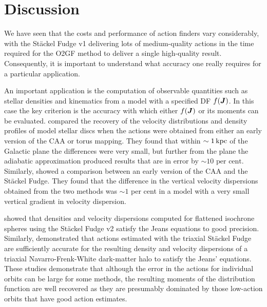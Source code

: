 \documentclass[useAMS,usenatbib,fleqn,a4paper]{mn2e}
\def\kpc{\,{\rm kpc}}
\def\percent{\text{ per cent}}
\newcommand{\bs}[1]{\bmath{#1}}
\def\percent{\text{ per cent}}
\newcommand{\vJ}{\bs{J}}\newcommand{\vx}{\bs{x}}
\begin{document}
\section{Discussion}\label{Sect::Discuss}

We have seen that the costs and performance of action finders vary
considerably, with the St\"ackel Fudge v1 delivering lots of medium-quality
actions in the time required for the O2GF method to deliver a single
high-quality result. Consequently, it is important to understand what
accuracy one really requires for a particular application.

An important application is the computation of observable quantities such as
stellar densities and kinematics from a model with a specified DF $f(\vJ)$.
In this case the key criterion is the accuracy with which either $f(\vJ)$ or
its moments can be evaluated.  \cite{BinneyMcMillan2011} compared the
recovery of the velocity distributions and density profiles of model stellar
discs when the actions were obtained from either an early version of the CAA
or torus mapping. They found that within $\sim1\kpc$ of the Galactic plane
the differences were very small, but further from the plane the adiabatic
approximation produced results that are in error by $\sim10\percent$.
Similarly, \cite{BovyRix2013} showed a comparison between an early version of
the CAA and the St\"ackel Fudge. They found that the difference in the
vertical velocity dispersions obtained from the two methods was $\sim1$ per
cent in a model with a very small vertical gradient in velocity dispersion.

\cite{Binney2014_ISO} showed that densities and velocity dispersions computed for
flattened isochrone spheres using the St\"ackel Fudge v2 satisfy the Jeans
equations to good precision. Similarly, 
\cite{SandersBinney2014} demonstrated that actions estimated with the
triaxial St\"ackel Fudge are sufficiently accurate for the resulting density
and velocity dispersions of a triaxial Navarro-Frenk-White dark-matter halo
to satisfy the Jeans' equations. These studies demonstrate that although the
error in the actions for individual orbits can be large for some methods, the
resulting moments of the distribution function are well recovered as they are
presumably dominated by those low-action orbits that have good action
estimates.
\end{document}

